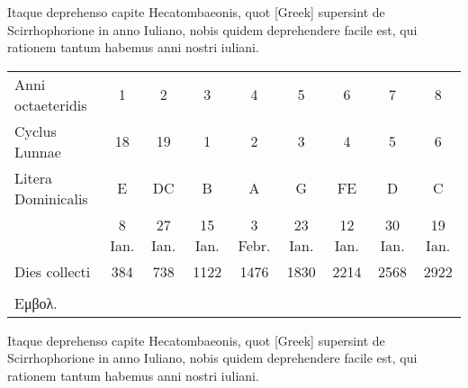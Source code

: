 \documentclass[draft,a4paper]{book}
\begin{document}
Itaque deprehenso capite Hecatombaeonis, quot
\textgreek{[Greek]} supersint de Scirrhophorione in anno Iuliano, nobis quidem
deprehendere facile est, qui rationem tantum habemus anni nostri
iuliani.
\begin{table}
\small
\centering
\setlength{\tabcolsep}{3pt}
\renewcommand{\arraystretch}{1.1}
\begin{tabular}{l cccccccc}
\hline
Anni octaeteridis &
1\super{†} & 2 & 3\super{†} & 4 & 5 & 6\super{†} & 7 & 8 \\
Cyclus Lunnae &
18 & 19 & 1 & 2 & 3 & 4 & 5 & 6 \\
Litera Dominicalis &
E & DC & B & A & G & FE & D & C \\
~ &
8 Ian. & 27 Ian. & 15 Ian. & 3 Febr. & 23 Ian. & 12 Ian. & 30 Ian. & 19 Ian. \\
Dies collecti &
384 &  738 & 1122 & 1476 & 1830 & 2214 & 2568 & 2922 \\
\hline
\\
\multicolumn{5}{l}{\footnotesize \super{†} \textgreek{Εμβολ.}}\\
\end{tabular}
\end{table}
Itaque deprehenso capite Hecatombaeonis, quot
\textgreek{[Greek]} supersint de Scirrhophorione in anno Iuliano, nobis quidem
deprehendere facile est, qui rationem tantum habemus anni nostri
iuliani.
\end{document}
